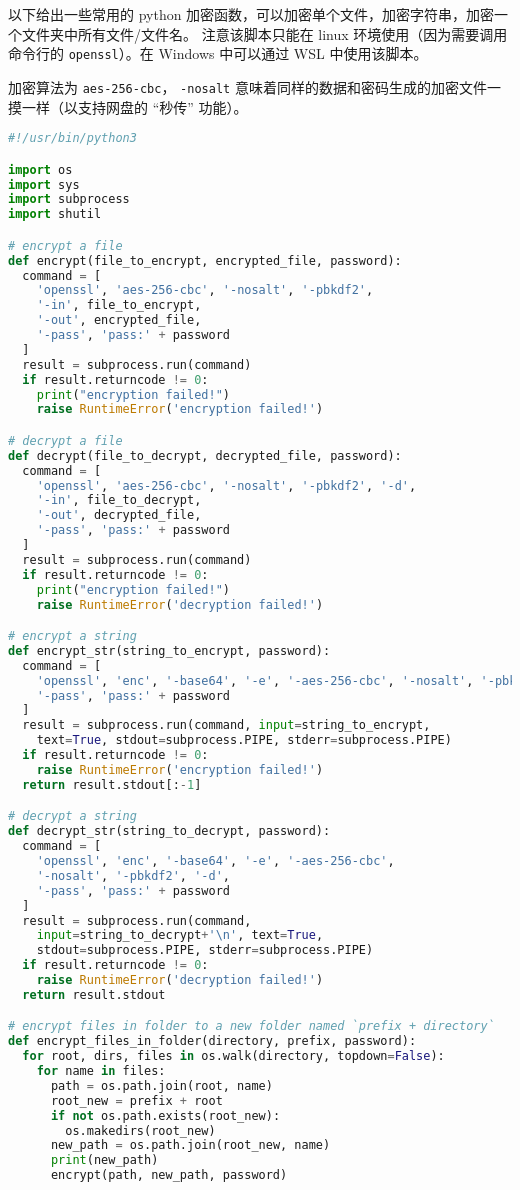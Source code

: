 


以下给出一些常用的 python 加密函数，可以加密单个文件，加密字符串，加密一个文件夹中所有文件/文件名。 注意该脚本只能在 linux 环境使用（因为需要调用命令行的 \verb`openssl`）。在 Windows 中可以通过 WSL 中使用该脚本。

加密算法为 \verb`aes-256-cbc`， \verb`-nosalt` 意味着同样的数据和密码生成的加密文件一摸一样（以支持网盘的 “秒传” 功能）。

\begin{lstlisting}[language=python]
#!/usr/bin/python3

import os
import sys
import subprocess
import shutil

# encrypt a file
def encrypt(file_to_encrypt, encrypted_file, password):
  command = [
    'openssl', 'aes-256-cbc', '-nosalt', '-pbkdf2',
    '-in', file_to_encrypt,
    '-out', encrypted_file,
    '-pass', 'pass:' + password
  ]
  result = subprocess.run(command)
  if result.returncode != 0:
    print("encryption failed!")
    raise RuntimeError('encryption failed!')

# decrypt a file
def decrypt(file_to_decrypt, decrypted_file, password):
  command = [
    'openssl', 'aes-256-cbc', '-nosalt', '-pbkdf2', '-d',
    '-in', file_to_decrypt,
    '-out', decrypted_file,
    '-pass', 'pass:' + password
  ]
  result = subprocess.run(command)
  if result.returncode != 0:
    print("encryption failed!")
    raise RuntimeError('decryption failed!')

# encrypt a string
def encrypt_str(string_to_encrypt, password):
  command = [
    'openssl', 'enc', '-base64', '-e', '-aes-256-cbc', '-nosalt', '-pbkdf2',
    '-pass', 'pass:' + password
  ]
  result = subprocess.run(command, input=string_to_encrypt,
    text=True, stdout=subprocess.PIPE, stderr=subprocess.PIPE)
  if result.returncode != 0:
    raise RuntimeError('encryption failed!')
  return result.stdout[:-1]

# decrypt a string
def decrypt_str(string_to_decrypt, password):
  command = [
    'openssl', 'enc', '-base64', '-e', '-aes-256-cbc',
    '-nosalt', '-pbkdf2', '-d',
    '-pass', 'pass:' + password
  ]
  result = subprocess.run(command,
    input=string_to_decrypt+'\n', text=True,
    stdout=subprocess.PIPE, stderr=subprocess.PIPE)
  if result.returncode != 0:
    raise RuntimeError('decryption failed!')
  return result.stdout

# encrypt files in folder to a new folder named `prefix + directory`
def encrypt_files_in_folder(directory, prefix, password):
  for root, dirs, files in os.walk(directory, topdown=False):
    for name in files:
      path = os.path.join(root, name)
      root_new = prefix + root
      if not os.path.exists(root_new):
        os.makedirs(root_new)
      new_path = os.path.join(root_new, name)
      print(new_path)
      encrypt(path, new_path, password)


\end{lstlisting}
